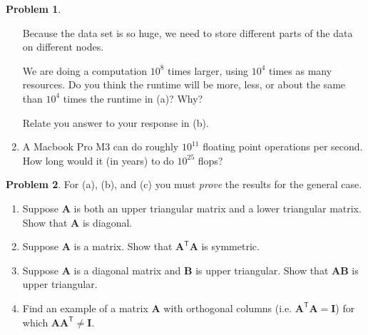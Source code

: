 \documentclass[12pt]{article}
\theoremstyle{definition}
\newtheorem{problem}{Problem}
\renewcommand{\vec}{\mathbf}
\newcommand{\T}{\mathsf{T}}
\begin{document}
\begin{problem}
\begin{enumerate}
            Because the data set is so huge, we need to store different parts of the data on different nodes. 

            We are doing a computation $10^8$ times larger, using $10^4$ times as many resources.
            Do you think the runtime will be more, less, or about the same than $10^4$ times the runtime in (a)? Why?

            Relate you answer to your response in (b).
        \item  A Macbook Pro M3 can do roughly $10^{11}$ floating point operations per second. How long would it (in years) to do $10^{25}$ flops? 
    \end{enumerate}
\end{problem}


\vfill
\begin{problem}For (a), (b), and (c) you must \emph{prove} the results for the general case. 
    \begin{enumerate}
        \item Suppose $\vec{A}$ is both an upper triangular matrix and a lower triangular matrix. Show that $\vec{A}$ is diagonal.
        \item Suppose $\vec{A}$ is a matrix. Show that $\vec{A}^\T \vec{A}$ is symmetric.
        \item Suppose $\vec{A}$ is a diagonal matrix and $\vec{B}$ is upper triangular. Show that $\vec{A}\vec{B}$ is upper triangular.
        \item Find an example of a matrix $\vec{A}$ with orthogonal columns (i.e. $\vec{A}^\T \vec{A} = \vec{I}$) for which $\vec{A}\vec{A}^\T \neq \vec{I}$. 
    \end{enumerate}
\end{problem}
\end{document}
